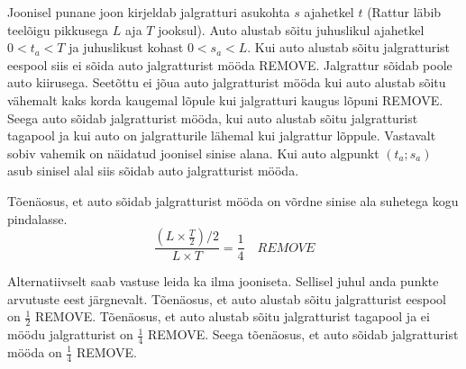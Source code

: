 \documentclass[10pt]{article}
\newcommand{\pp}[1]{REMOVE}
\begin{document}

\solu
Joonisel punane joon kirjeldab jalgratturi asukohta $s$ ajahetkel $t$ (Rattur läbib teelõigu pikkusega $L$ aja $T$ jooksul). Auto alustab sõitu juhuslikul ajahetkel $0 < t_a < T$ ja juhuslikust kohast $0 < s_a < L$. Kui auto alustab sõitu jalgratturist eespool siis ei sõida auto jalgratturist mööda \pp{2}. Jalgrattur sõidab poole auto kiirusega. Seetõttu ei jõua auto jalgratturist mööda kui auto alustab sõitu vähemalt kaks korda kaugemal lõpule kui jalgratturi kaugus lõpuni \pp{2}. Seega auto sõidab jalgratturist mööda, kui auto alustab sõitu jalgratturist tagapool ja kui auto on jalgratturile lähemal kui jalgrattur lõppule. Vastavalt sobiv vahemik on näidatud joonisel sinise alana. Kui auto algpunkt $(t_a; s_a)$ asub sinisel alal siis sõidab auto jalgratturist mööda.

\begin{figure}[H]
  \centering
\end{figure}


Tõenäosus, et auto sõidab jalgratturist mööda on võrdne sinise ala suhetega kogu pindalasse.
$$\frac{(L\times \frac T2)/2}{L \times T} = \frac{1}{4} \quad \pp{6}$$

Alternatiivselt saab vastuse leida ka ilma jooniseta. Sellisel juhul anda punkte arvutuste eest järgnevalt. Tõenäosus, et auto alustab sõitu jalgratturist eespool on $\frac{1}{2}$ \pp{2}. Tõenäosus, et auto alustab sõitu jalgratturist tagapool ja ei möödu jalgratturist on $\frac{1}{4}$ \pp{3}. Seega tõenäosus, et auto sõidab jalgratturist mööda on  $\frac{1}{4}$ \pp{1}.
\probend
\bigskip

\end{document}
